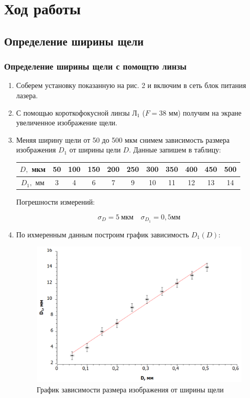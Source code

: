 \documentclass[a4paper, 12pt]{article}%
\begin{document}
\section*{Ход работы}

\subsection*{Определение ширины щели}

\subsubsection*{Определение ширины щели с помощтю линзы}

\begin{enumerate}

\item Соберем установку показанную на рис. 2 и включим в сеть блок питания лазера.

\item С помощью короткофокусной линзы $\text{Л}_1$ ($F = 38$ мм) получим на экране увеличенное изображение щели.

\item Меняя ширину щели от 50 до 500 мкм снимем зависимость размера изображения $D_1$ от ширины цели $D$. Данные запишем в таблицу:

\begin{center}
\begin{tabular}{|c|c|c|c|c|c|c|c|c|c|c|}
\hline 
$D,$ мкм & 50 & 100 & 150 & 200 & 250 & 300 & 350 & 400 & 450 & 500 \\ 
\hline 
$D_1,$ мм & 3 & 4 & 6 & 7 & 9 & 10 & 11 & 12 & 13 & 14 \\ 
\hline 
\end{tabular} 
\end{center}

Погрешности измерений:

\[\sigma_D = 5 \: \text{мкм} \quad \sigma_{D_1} = 0,5 \text{мм}\]

\item По ихмеренным данным построим график зависимость $D_1 (D)$:

\begin{figure}[h!]
	\includegraphics[width = 1.0\linewidth]{images/graph_1.png}
	\caption{График зависимости размера изображения от ширины щели}
\end{figure}


\end{enumerate}
\end{document}
